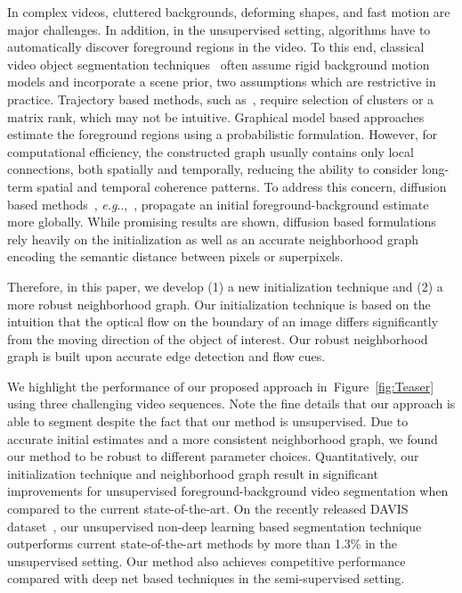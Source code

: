 \documentclass[runningheads]{llncs}
\makeatletter
\def\@onedot{\ifx\@let@token.\else.\null\fi\xspace}
\DeclareRobustCommand\onedot{\futurelet\@let@token\@onedot}
\newcommand{\figref}[1]{Figure~\ref{#1}}
\def\eg{\emph{e.g}\onedot} \def\Eg{\emph{E.g}\onedot}
\makeatother
\begin{document}
In complex videos, cluttered backgrounds, deforming shapes, and fast motion are major challenges. In addition, in the unsupervised setting, algorithms have to automatically discover foreground regions in the video. To this end, classical video object segmentation techniques~\cite{BrutzerCVPR2011,CriminisiCVPR2006,ElgammalIEEE2002,HaymanICCV2003,IraniIJCV1994,RenPRL2003,IraniPAMI1998,TorrECCV1998,YuanPAMI2007} often assume rigid background motion models and incorporate a scene prior, two assumptions which are restrictive in practice. Trajectory based methods, such as~\cite{CosteiraICCV1995,ElhamifarCVPR2009,RaoCVPR2008,BroxECCV2010,fragkiadaki2012video}, require selection of clusters or a matrix rank, which may not be intuitive. Graphical model based approaches \cite{JainECCV14,BadrinarayananCVPR2010,GalassoICCV2013,TsaiBMVC2010,VijayanarasimhanECCV2012,TsaiCVPR2016} estimate the foreground regions using a probabilistic formulation. However, for computational efficiency, the constructed graph usually contains only local connections, both spatially and temporally, reducing the ability to consider long-term spatial and temporal coherence patterns. To address this concern, diffusion based methods~\cite{Lovász93randomwalks}, \eg,~\cite{FaktorBMVC14,wang2012probabilistic}, propagate an initial foreground-background estimate more globally. While promising results are shown, diffusion based formulations rely heavily on the initialization as well as an accurate neighborhood graph encoding the semantic distance between pixels or superpixels.



Therefore, in this paper, we develop (1) a new initialization technique and (2) a more robust neighborhood graph. Our initialization technique is based on the intuition that the optical flow on the boundary of an image differs significantly from the moving direction of the object of interest. Our robust neighborhood graph is built upon accurate edge detection and flow cues. 


We highlight the performance of our proposed approach in~\figref{fig:Teaser} using three challenging video sequences. Note the fine details that our approach is able to segment despite the fact that our method is unsupervised. Due to accurate initial estimates and a more consistent neighborhood graph, we found our method to be robust to different parameter choices.  Quantitatively, our initialization technique and neighborhood graph result in significant improvements for unsupervised foreground-background video segmentation when compared to the current state-of-the-art. On the recently released DAVIS dataset~\cite{PerazziCVPR16}, our unsupervised non-deep learning based segmentation technique outperforms current state-of-the-art methods by more than 1.3\% in the unsupervised setting.
Our method also achieves competitive performance compared with deep net based techniques in the semi-supervised setting.
\end{document}

